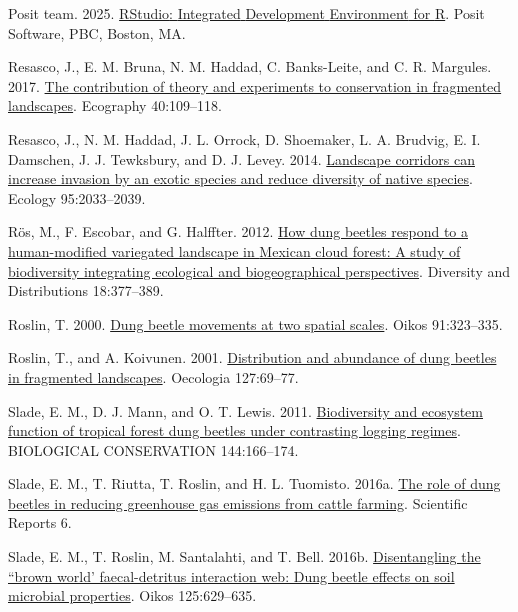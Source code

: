 \documentclass[
  man, donotrepeattitle]{apa6}
\newlength{\cslhangindent}
\newenvironment{CSLReferences}[2] %
 {\begin{list}{}{%
  \setlength{\itemindent}{0pt}
  \setlength{\leftmargin}{0pt}
  \setlength{\parsep}{0pt}
  \ifodd #1
   \setlength{\leftmargin}{\cslhangindent}
   \setlength{\itemindent}{-1\cslhangindent}
  \fi
  \setlength{\itemsep}{#2\baselineskip}}}
 {\end{list}}
\begin{document}
\begin{CSLReferences}{1}{0}
Posit team. 2025. \href{http://www.posit.co/}{{RStudio}: {Integrated} {Development} {Environment} for {R}}. Posit Software, PBC, Boston, MA.

Resasco, J., E. M. Bruna, N. M. Haddad, C. Banks-Leite, and C. R. Margules. 2017. \href{https://doi.org/10.1111/ecog.02546}{The contribution of theory and experiments to conservation in fragmented landscapes}. Ecography 40:109--118.

Resasco, J., N. M. Haddad, J. L. Orrock, D. Shoemaker, L. A. Brudvig, E. I. Damschen, J. J. Tewksbury, and D. J. Levey. 2014. \href{https://doi.org/10.1890/14-0169.1}{Landscape corridors can increase invasion by an exotic species and reduce diversity of native species}. Ecology 95:2033--2039.

Rös, M., F. Escobar, and G. Halffter. 2012. \href{https://doi.org/10.1111/j.1472-4642.2011.00834.x}{How dung beetles respond to a human-modified variegated landscape in {Mexican} cloud forest: A study of biodiversity integrating ecological and biogeographical perspectives}. Diversity and Distributions 18:377--389.

Roslin, T. 2000. \href{https://doi.org/10.1034/j.1600-0706.2000.910213.x}{Dung beetle movements at two spatial scales}. Oikos 91:323--335.

Roslin, T., and A. Koivunen. 2001. \href{https://doi.org/10.1007/s004420000565}{Distribution and abundance of dung beetles in fragmented landscapes}. Oecologia 127:69--77.

Slade, E. M., D. J. Mann, and O. T. Lewis. 2011. \href{https://doi.org/10.1016/j.biocon.2010.08.011}{Biodiversity and ecosystem function of tropical forest dung beetles under contrasting logging regimes}. BIOLOGICAL CONSERVATION 144:166--174.

Slade, E. M., T. Riutta, T. Roslin, and H. L. Tuomisto. 2016a. \href{https://doi.org/10.1038/srep18140}{The role of dung beetles in reducing greenhouse gas emissions from cattle farming}. Scientific Reports 6.

Slade, E. M., T. Roslin, M. Santalahti, and T. Bell. 2016b. \href{https://doi.org/10.1111/oik.02640}{Disentangling the ``brown world' faecal-detritus interaction web: Dung beetle effects on soil microbial properties}. Oikos 125:629--635.


\end{CSLReferences}
\end{document}
